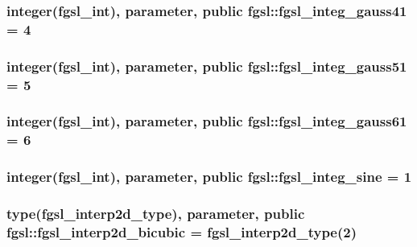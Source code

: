 \subsubsection[{fgsl\+\_\+integ\+\_\+gauss41}]{\setlength{\rightskip}{0pt plus 5cm}integer({\bf fgsl\+\_\+int}), parameter, public fgsl\+::fgsl\+\_\+integ\+\_\+gauss41 = 4}\label{namespacefgsl_a5c219f8f951d411c63849088e0e224da}
\hypertarget{namespacefgsl_a8331538c5a42b13f0893e34864bae6d7}{}
\subsubsection[{fgsl\+\_\+integ\+\_\+gauss51}]{\setlength{\rightskip}{0pt plus 5cm}integer({\bf fgsl\+\_\+int}), parameter, public fgsl\+::fgsl\+\_\+integ\+\_\+gauss51 = 5}\label{namespacefgsl_a8331538c5a42b13f0893e34864bae6d7}
\hypertarget{namespacefgsl_ac82cf20c4bb7b1f3a6053020016abfed}{}
\subsubsection[{fgsl\+\_\+integ\+\_\+gauss61}]{\setlength{\rightskip}{0pt plus 5cm}integer({\bf fgsl\+\_\+int}), parameter, public fgsl\+::fgsl\+\_\+integ\+\_\+gauss61 = 6}\label{namespacefgsl_ac82cf20c4bb7b1f3a6053020016abfed}
\hypertarget{namespacefgsl_a4cc7312b9db6359e7b0cdc32f98ce88d}{}
\subsubsection[{fgsl\+\_\+integ\+\_\+sine}]{\setlength{\rightskip}{0pt plus 5cm}integer({\bf fgsl\+\_\+int}), parameter, public fgsl\+::fgsl\+\_\+integ\+\_\+sine = 1}\label{namespacefgsl_a4cc7312b9db6359e7b0cdc32f98ce88d}
\hypertarget{namespacefgsl_ad4d0be659abe19e96011c7a31d8c7e1c}{}
\subsubsection[{fgsl\+\_\+interp2d\+\_\+bicubic}]{\setlength{\rightskip}{0pt plus 5cm}type({\bf fgsl\+\_\+interp2d\+\_\+type}), parameter, public fgsl\+::fgsl\+\_\+interp2d\+\_\+bicubic = {\bf fgsl\+\_\+interp2d\+\_\+type}(2)}\label{namespacefgsl_ad4d0be659abe19e96011c7a31d8c7e1c}
\hypertarget{namespacefgsl_aaa41b206c74a9dd325809f55b148d24e}{}

